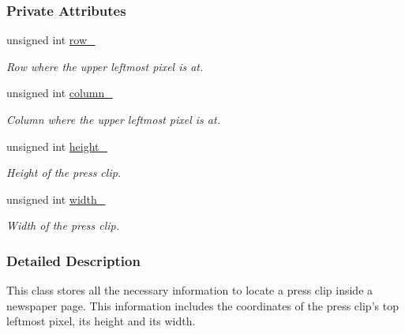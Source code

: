 \subsubsection*{Private Attributes}
\begin{CompactItemize}
\item 
\hypertarget{class_clip_location_1b2df7d88f1e70c6092704f0a5844d39}{
unsigned int \hyperlink{class_clip_location_1b2df7d88f1e70c6092704f0a5844d39}{row\_\-}}
\label{class_clip_location_1b2df7d88f1e70c6092704f0a5844d39}

\begin{CompactList}\small\item\em Row where the upper leftmost pixel is at. \item\end{CompactList}\item 
\hypertarget{class_clip_location_333e41e770e4cc18938b639a9072c138}{
unsigned int \hyperlink{class_clip_location_333e41e770e4cc18938b639a9072c138}{column\_\-}}
\label{class_clip_location_333e41e770e4cc18938b639a9072c138}

\begin{CompactList}\small\item\em Column where the upper leftmost pixel is at. \item\end{CompactList}\item 
\hypertarget{class_clip_location_bf304a78eade46f1b5c6cfcf42e15643}{
unsigned int \hyperlink{class_clip_location_bf304a78eade46f1b5c6cfcf42e15643}{height\_\-}}
\label{class_clip_location_bf304a78eade46f1b5c6cfcf42e15643}

\begin{CompactList}\small\item\em Height of the press clip. \item\end{CompactList}\item 
\hypertarget{class_clip_location_e39508c504ce7807d730e58c0270d2f9}{
unsigned int \hyperlink{class_clip_location_e39508c504ce7807d730e58c0270d2f9}{width\_\-}}
\label{class_clip_location_e39508c504ce7807d730e58c0270d2f9}

\begin{CompactList}\small\item\em Width of the press clip. \item\end{CompactList}\end{CompactItemize}


\subsubsection{Detailed Description}
This class stores all the necessary information to locate a press clip inside a newspaper page. This information includes the coordinates of the press clip's top leftmost pixel, its height and its width.

